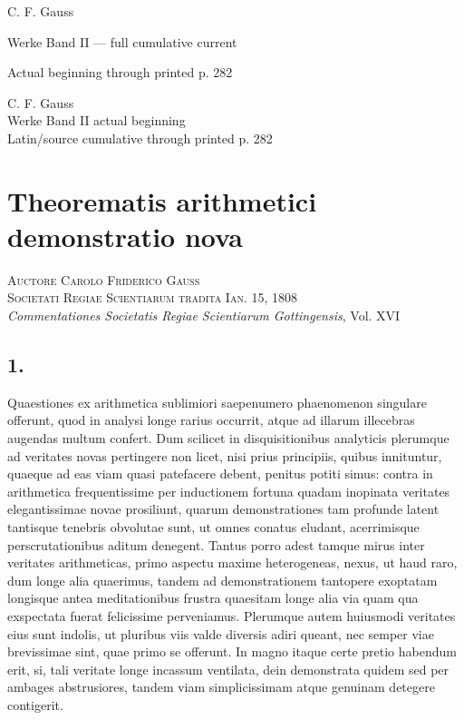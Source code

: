 \documentclass[12pt]{article}
\begin{document}
\begin{center}
{\Large C. F. Gauss}\par
{\large Werke Band II — full cumulative current}\par
{\large Actual beginning through printed p. 282}
\end{center}



\begin{center}
{\Large C. F. Gauss}\\[3pt]
{\large Werke Band II actual beginning}\\[3pt]
{\large Latin/source cumulative through printed p. 282}
\end{center}


\section*{Theorematis arithmetici demonstratio nova}

\begin{center}
\textsc{Auctore Carolo Friderico Gauss}\\
\textsc{Societati Regiae Scientiarum tradita Ian. 15, 1808}\\[3pt]
\emph{Commentationes Societatis Regiae Scientiarum Gottingensis}, Vol. XVI
\end{center}

\subsection*{1.}

Quaestiones ex arithmetica sublimiori saepenumero phaenomenon singulare offerunt, quod in analysi longe rarius occurrit, atque ad illarum illecebras augendas multum confert. Dum scilicet in disquisitionibus analyticis plerumque ad veritates novas pertingere non licet, nisi prius principiis, quibus innituntur, quaeque ad eas viam quasi patefacere debent, penitus potiti simus: contra in arithmetica frequentissime per inductionem fortuna quadam inopinata veritates elegantissimae novae prosiliunt, quarum demonstrationes tam profunde latent tantisque tenebris obvolutae sunt, ut omnes conatus eludant, acerrimisque perscrutationibus aditum denegent. Tantus porro adest tamque mirus inter veritates arithmeticas, primo aspectu maxime heterogeneas, nexus, ut haud raro, dum longe alia quaerimus, tandem ad demonstrationem tantopere exoptatam longisque antea meditationibus frustra quaesitam longe alia via quam qua exspectata fuerat felicissime perveniamus. Plerumque autem huiusmodi veritates eius sunt indolis, ut pluribus viis valde diversis adiri queant, nec semper viae brevissimae sint, quae primo se offerunt. In magno itaque certe pretio habendum erit, si, tali veritate longe incassum ventilata, dein demonstrata quidem sed per ambages abstrusiores, tandem viam simplicissimam atque genuinam detegere contigerit.
\end{document}

